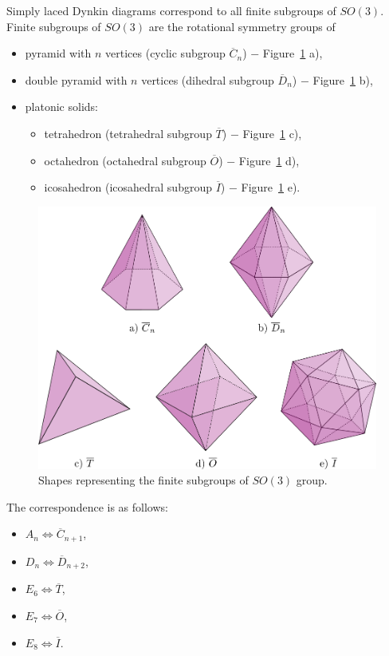 Simply laced Dynkin diagrams correspond to all finite subgroups of
$SO(3)$. Finite subgroups of
$SO(3)$ are the rotational symmetry groups of
\begin{itemize}
    \item pyramid with $n$ vertices (cyclic subgroup $\overline{C}_n$) $-$ Figure~\ref{img:34} a),
    \item double pyramid with $n$ vertices (dihedral subgroup $\overline{D}_n$) $-$ Figure~\ref{img:34} b),
    \item platonic solids:
    \begin{itemize}
        \item tetrahedron (tetrahedral subgroup $\overline{T}$) $-$ Figure~\ref{img:34} c),
        \item octahedron (octahedral subgroup $\overline{O}$) $-$ Figure~\ref{img:34} d),
        \item icosahedron (icosahedral subgroup $\overline{I}$) $-$ Figure~\ref{img:34} e).
    \end{itemize}
\end{itemize}

\begin{figure}
    \centerline{\includegraphics[scale=0.5]{images/img34}}
    \caption[Shapes representing the finite subgroups of $SO(3)$ group]
    {Shapes representing the finite subgroups of $SO(3)$ group.}
    \label{img:34}
\end{figure}

The correspondence is as follows:
\begin{itemize}
    \item $A_n \iff \overline{C}_{n+1}$,
    \item $D_n \iff \overline{D}_{n+2}$,
    \item $E_6 \iff \overline{T}$,
    \item $E_7 \iff \overline{O}$,
    \item $E_8 \iff \overline{I}$.
\end{itemize}

